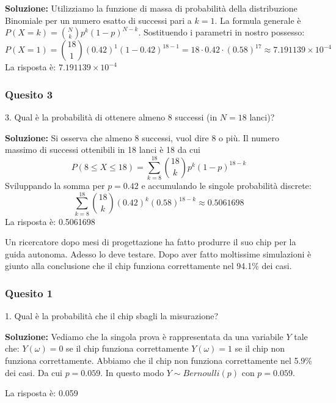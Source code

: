\documentclass[12pt, a4paper]{article}
\begin{document}
\textbf{Soluzione:}
Utilizziamo la funzione di massa di probabilità della distribuzione Binomiale per un numero esatto di successi pari a $k=1$. La formula generale è $P(X=k) = \binom{N}{k} p^k (1-p)^{N-k}$. Sostituendo i parametri in nostro possesso:
$$ P(X=1) = \binom{18}{1} (0.42)^1 (1-0.42)^{18-1} = 18 \cdot 0.42 \cdot (0.58)^{17} \approx 7.191139 \times 10^{-4} $$
La risposta è: $7.191139 \times 10^{-4}$

\newpage

\subsubsection*{Quesito 3}
3. Qual è la probabilità di ottenere almeno 8 successi (in $N=18$ lanci)?

\textbf{Soluzione:}
Si osserva che almeno 8 successi, vuol dire 8 o più. Il numero massimo di successi ottenibili in 18 lanci è 18 da cui
$$ P(8 \leq X \leq 18) = \sum_{k=8}^{18} \binom{18}{k} p^k (1-p)^{18-k} $$
Sviluppando la somma per $p=0.42$ e accumulando le singole probabilità discrete:
$$ \sum_{k=8}^{18} \binom{18}{k} (0.42)^k (0.58)^{18-k} \approx 0.5061698 $$
La risposta è: 0.5061698


\vspace{0.5cm}
\begin{tcolorbox}[colback=lightergray!10, colframe=tocsec, title=\textbf{Esercizio 3}]
Un ricercatore dopo mesi di progettazione ha fatto produrre il suo chip per la guida autonoma. Adesso lo deve testare. Dopo aver fatto moltissime simulazioni è giunto alla conclusione che il chip funziona correttamente nel 94.1\% dei casi.
\end{tcolorbox}

\subsubsection*{Quesito 1}
1. Qual è la probabilità che il chip sbagli la misurazione?

\textbf{Soluzione:}
Vediamo che la singola prova è rappresentata da una variabile $Y$ tale che:
$Y(\omega) = 0$ se il chip funziona correttamente
$Y(\omega) = 1$ se il chip non funziona correttamente.
Abbiamo che il chip non funziona correttamente nel 5.9\% dei casi. Da cui $p=0.059$.
In questo modo $Y \sim Bernoulli(p)$ con $p=0.059$.

La risposta è: 0.059
\end{document}
